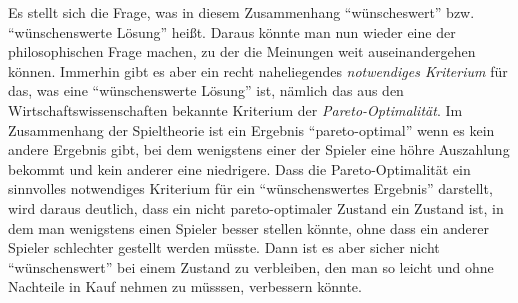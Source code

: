 Es stellt sich die Frage, was in diesem Zusammenhang "`wünscheswert"' bzw.
"`wünschenswerte Lösung"' heißt. Daraus könnte man nun wieder eine der
philosophischen Frage machen, zu der die Meinungen weit auseinandergehen
können. Immerhin gibt es aber ein recht naheliegendes {\em notwendiges
Kriterium} für das, was eine "`wünschenswerte Lösung"' ist, nämlich das aus den
Wirtschaftswissenschaften bekannte Kriterium der {\em Pareto-Optimalität}. Im Zusammenhang der
Spieltheorie ist ein Ergebnis "`pareto-optimal"' wenn es kein andere Ergebnis gibt, bei dem
wenigstens einer der Spieler eine höhre Auszahlung bekommt und kein anderer
eine niedrigere. Dass die Pareto-Optimalität ein sinnvolles notwendiges
Kriterium für ein "`wünschenswertes Ergebnis"' darstellt, wird daraus deutlich,
dass ein nicht pareto-optimaler Zustand ein Zustand ist, in dem man
wenigstens einen Spieler besser stellen könnte, ohne dass ein anderer Spieler
schlechter gestellt werden müsste. Dann ist es aber sicher nicht
"`wünschenswert"' bei einem Zustand zu verbleiben, 
den man so leicht und ohne Nachteile in Kauf nehmen zu müsssen, verbessern
könnte.

